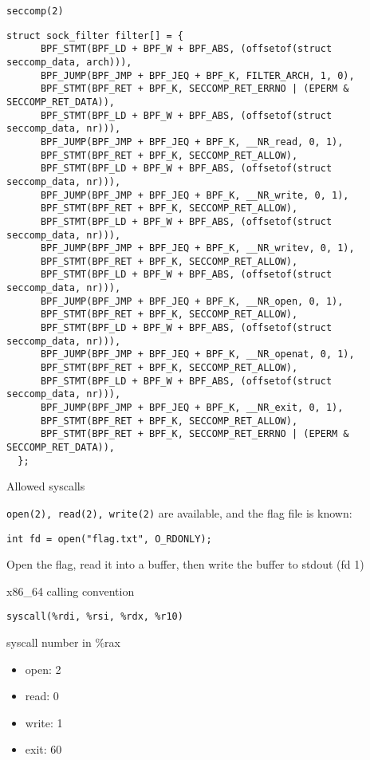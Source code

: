 \documentclass{beamer}
\begin{document}
\begin{frame}[fragile]
{\tt seccomp(2)} 
 \begin{lstlisting}[firstnumber=66]
  struct sock_filter filter[] = {
      BPF_STMT(BPF_LD + BPF_W + BPF_ABS, (offsetof(struct seccomp_data, arch))),
      BPF_JUMP(BPF_JMP + BPF_JEQ + BPF_K, FILTER_ARCH, 1, 0),
      BPF_STMT(BPF_RET + BPF_K, SECCOMP_RET_ERRNO | (EPERM & SECCOMP_RET_DATA)),
      BPF_STMT(BPF_LD + BPF_W + BPF_ABS, (offsetof(struct seccomp_data, nr))),
      BPF_JUMP(BPF_JMP + BPF_JEQ + BPF_K, __NR_read, 0, 1),
      BPF_STMT(BPF_RET + BPF_K, SECCOMP_RET_ALLOW),
      BPF_STMT(BPF_LD + BPF_W + BPF_ABS, (offsetof(struct seccomp_data, nr))),
      BPF_JUMP(BPF_JMP + BPF_JEQ + BPF_K, __NR_write, 0, 1),
      BPF_STMT(BPF_RET + BPF_K, SECCOMP_RET_ALLOW),
      BPF_STMT(BPF_LD + BPF_W + BPF_ABS, (offsetof(struct seccomp_data, nr))),
      BPF_JUMP(BPF_JMP + BPF_JEQ + BPF_K, __NR_writev, 0, 1),
      BPF_STMT(BPF_RET + BPF_K, SECCOMP_RET_ALLOW),
      BPF_STMT(BPF_LD + BPF_W + BPF_ABS, (offsetof(struct seccomp_data, nr))),
      BPF_JUMP(BPF_JMP + BPF_JEQ + BPF_K, __NR_open, 0, 1),
      BPF_STMT(BPF_RET + BPF_K, SECCOMP_RET_ALLOW),
      BPF_STMT(BPF_LD + BPF_W + BPF_ABS, (offsetof(struct seccomp_data, nr))),
      BPF_JUMP(BPF_JMP + BPF_JEQ + BPF_K, __NR_openat, 0, 1),
      BPF_STMT(BPF_RET + BPF_K, SECCOMP_RET_ALLOW),
      BPF_STMT(BPF_LD + BPF_W + BPF_ABS, (offsetof(struct seccomp_data, nr))),
      BPF_JUMP(BPF_JMP + BPF_JEQ + BPF_K, __NR_exit, 0, 1),
      BPF_STMT(BPF_RET + BPF_K, SECCOMP_RET_ALLOW),
      BPF_STMT(BPF_RET + BPF_K, SECCOMP_RET_ERRNO | (EPERM & SECCOMP_RET_DATA)),
  };
 \end{lstlisting}
\end{frame}

\begin{frame}[fragile]
{Allowed syscalls}

{\tt open(2), read(2), write(2)} are available, and the flag file is known:

\begin{lstlisting}[firstnumber=104]
        int fd = open("flag.txt", O_RDONLY);
\end{lstlisting}

Open the flag, read it into a buffer, then write the buffer to stdout (fd 1)

\end{frame}

\begin{frame}
{x86\_64 calling convention}
 
 {\tt syscall(\%rdi, \%rsi, \%rdx, \%r10)}
 
 syscall number in \%rax
 
 \begin{itemize}
  \item open: 2
  \item read: 0
  \item write: 1
  \item exit: 60
 \end{itemize}
 
\end{frame}
\end{document}
